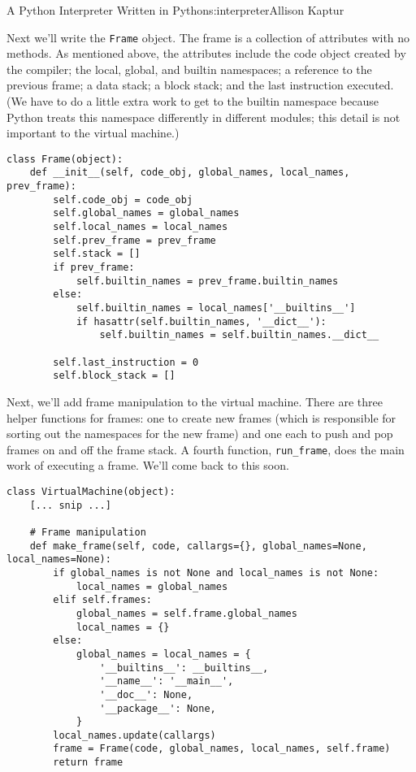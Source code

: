 \begin{aosachapter}{A Python Interpreter Written in Python}{s:interpreter}{Allison Kaptur}
\label{the-frame-class}

Next we'll write the \texttt{Frame} object. The frame is a collection of
attributes with no methods. As mentioned above, the attributes include
the code object created by the compiler; the local, global, and builtin
namespaces; a reference to the previous frame; a data stack; a block
stack; and the last instruction executed. (We have to do a little extra
work to get to the builtin namespace because Python treats this
namespace differently in different modules; this detail is not important
to the virtual machine.)

\begin{verbatim}
class Frame(object):
    def __init__(self, code_obj, global_names, local_names, prev_frame):
        self.code_obj = code_obj
        self.global_names = global_names
        self.local_names = local_names
        self.prev_frame = prev_frame
        self.stack = []
        if prev_frame:
            self.builtin_names = prev_frame.builtin_names
        else:
            self.builtin_names = local_names['__builtins__']
            if hasattr(self.builtin_names, '__dict__'):
                self.builtin_names = self.builtin_names.__dict__

        self.last_instruction = 0
        self.block_stack = []
\end{verbatim}

Next, we'll add frame manipulation to the virtual machine. There are
three helper functions for frames: one to create new frames (which is
responsible for sorting out the namespaces for the new frame) and one
each to push and pop frames on and off the frame stack. A fourth
function, \texttt{run\_frame}, does the main work of executing a frame.
We'll come back to this soon.

\begin{verbatim}
class VirtualMachine(object):
    [... snip ...]

    # Frame manipulation
    def make_frame(self, code, callargs={}, global_names=None, local_names=None):
        if global_names is not None and local_names is not None:
            local_names = global_names
        elif self.frames:
            global_names = self.frame.global_names
            local_names = {}
        else:
            global_names = local_names = {
                '__builtins__': __builtins__,
                '__name__': '__main__',
                '__doc__': None,
                '__package__': None,
            }
        local_names.update(callargs)
        frame = Frame(code, global_names, local_names, self.frame)
        return frame


\end{verbatim}
\end{aosachapter}
